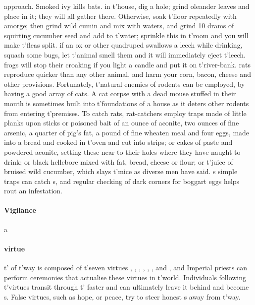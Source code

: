 approach. Smoked ivy kills bats.  in t'\allowbreak house, dig a hole; grind oleander leaves and place in it; they will all gather there. Otherwise, soak t'\allowbreak floor repeatedly with amorge; then grind wild cumin and mix with waters, and grind 10 drams of squirting cucumber seed and add to t'\allowbreak water; sprinkle this in t'\allowbreak room and you will make t'\allowbreak fleas split.  if an ox or other quadruped swallows a leech while drinking, squash some bugs, let t'\allowbreak animal smell them and it will immediately eject t'\allowbreak leech.  frogs will stop their croaking if you light a candle and put it on t'\allowbreak river-bank.  rats reproduce quicker than any other animal, and harm your corn, bacon, cheese and other provisions. Fortunately, t'\allowbreak natural enemies of rodents can be employed, by having a good array of cats. A cat corpse with a dead mouse stuffed in their mouth is sometimes built into t'\allowbreak foundations of a house as it deters other rodents from entering t'\allowbreak premises. To catch rats, rat-catchers employ traps made of little planks upon sticks or poisoned bait of an ounce of aconite, two ounces of fine arsenic, a quarter of pig's fat, a pound of fine wheaten meal and four eggs, made into a bread and cooked in t'\allowbreak oven and cut into strips; or cakes of paste and powdered aconite, setting these near to their holes where they have naught to drink; or black hellebore mixed with fat, bread, cheese or flour; or t'\allowbreak juice of bruised wild cucumber, which slays t'\allowbreak mice as diverse men have said. s simple traps can catch s, and regular checking of dark corners for boggart eggs helps rout an infestation.
\paragraph{Vigilance} a  
\paragraph{virtue} t'\allowbreak {} of t'\allowbreak way is composed of t'\allowbreak seven virtues , , , , , , and , and Imperial priests can perform ceremonies that actualise these virtues in t'\allowbreak world. Individuals following t'\allowbreak virtues transit through t'\allowbreak {} faster and can ultimately leave it behind and become s. False virtues, such as hope,  or peace, try to steer honest s away from t'\allowbreak way. 
